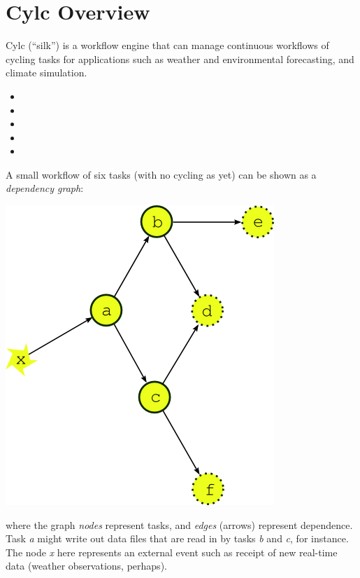 \section{Cylc Overview}
\label{Cylc Overview}


Cylc (``silk'') is a workflow engine that can manage continuous workflows of
cycling tasks for applications such as weather and environmental
forecasting, and climate simulation.

\begin{itemize}
    \item {}
    \item {}
    \item {}
    \item {}
    \item {} 
\end{itemize}

A small workflow of six tasks (with no cycling as yet) can be shown as a {\em
dependency graph}:

\begin{center}
    \includegraphics[width=0.25\columnwidth]{resources/tex/dep-one-cycle}
\end{center}

where the graph {\em nodes} represent tasks, and {\em edges} (arrows) represent
dependence.  Task {\em a} might write out data files that are read in by tasks
{\em b} and {\em c}, for instance.  The node {\em x} here represents an
external event such as receipt of new real-time data (weather observations,
perhaps).

